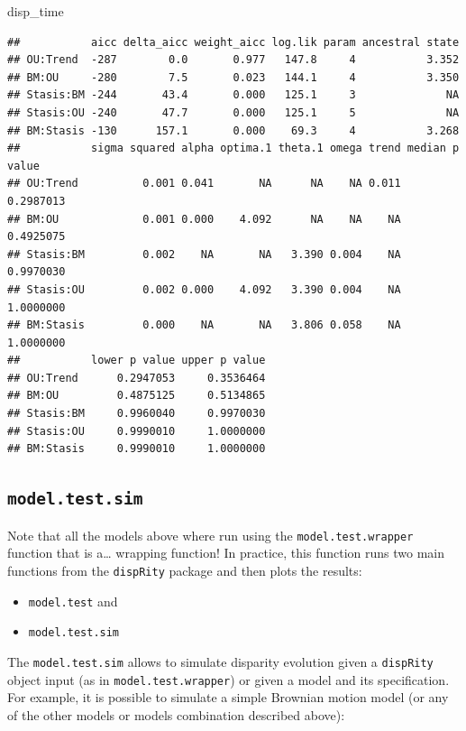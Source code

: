 \documentclass[
]{book}
\newenvironment{Shaded}{\begin{snugshade}}{\end{snugshade}}
\newcommand{\NormalTok}[1]{#1}
\providecommand{\tightlist}{%
  \setlength{\itemsep}{0pt}\setlength{\parskip}{0pt}}
\begin{document}
\begin{Shaded}
\begin{Highlighting}[]
\NormalTok{disp\_time}
\end{Highlighting}
\end{Shaded}

\begin{verbatim}
##           aicc delta_aicc weight_aicc log.lik param ancestral state
## OU:Trend  -287        0.0       0.977   147.8     4           3.352
## BM:OU     -280        7.5       0.023   144.1     4           3.350
## Stasis:BM -244       43.4       0.000   125.1     3              NA
## Stasis:OU -240       47.7       0.000   125.1     5              NA
## BM:Stasis -130      157.1       0.000    69.3     4           3.268
##           sigma squared alpha optima.1 theta.1 omega trend median p value
## OU:Trend          0.001 0.041       NA      NA    NA 0.011      0.2987013
## BM:OU             0.001 0.000    4.092      NA    NA    NA      0.4925075
## Stasis:BM         0.002    NA       NA   3.390 0.004    NA      0.9970030
## Stasis:OU         0.002 0.000    4.092   3.390 0.004    NA      1.0000000
## BM:Stasis         0.000    NA       NA   3.806 0.058    NA      1.0000000
##           lower p value upper p value
## OU:Trend      0.2947053     0.3536464
## BM:OU         0.4875125     0.5134865
## Stasis:BM     0.9960040     0.9970030
## Stasis:OU     0.9990010     1.0000000
## BM:Stasis     0.9990010     1.0000000
\end{verbatim}

\hypertarget{model.test.sim}{%
\subsection{\texorpdfstring{\texttt{model.test.sim}}{model.test.sim}}\label{model.test.sim}}

Note that all the models above where run using the \texttt{model.test.wrapper} function that is a\ldots{} wrapping function!
In practice, this function runs two main functions from the \texttt{dispRity} package and then plots the results:

\begin{itemize}
\tightlist
\item
  \texttt{model.test} and
\item
  \texttt{model.test.sim}
\end{itemize}

The \texttt{model.test.sim} allows to simulate disparity evolution given a \texttt{dispRity} object input (as in \texttt{model.test.wrapper}) or given a model and its specification.
For example, it is possible to simulate a simple Brownian motion model (or any of the other models or models combination described above):
\end{document}
